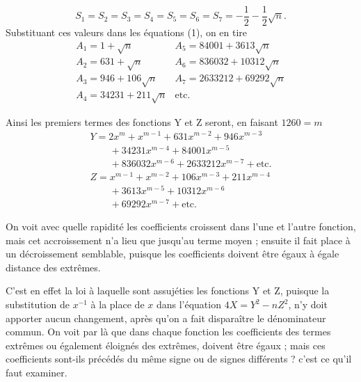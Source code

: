 \documentclass[11pt,a4paper]{article}
\begin{document}

\[
S_1 = S_2 = S_3 = S_4 = S_5 = S_6 = S_7 = -\frac{1}{2} - \frac{1}{2}\sqrt{n}.
\]
Substituant ces valeurs dans les équations (1), on en tire
\[
\begin{array}{ll}
A_1 = 1 + \sqrt{n} & A_5 = 84001 + 3613\sqrt{n} \\
A_2 = 631 + \sqrt{n} & A_6 = 836032 + 10312\sqrt{n} \\
A_3 = 946 + 106\sqrt{n} & A_7 = 2633212 + 69292\sqrt{n} \\
A_4 = 34231 + 211\sqrt{n} & \text{etc.}
\end{array}
\]

Ainsi les premiers termes des fonctions Y et Z seront, en faisant
$1260 = m$
\[
\begin{array}{l}
Y = 2x^m + x^{m-1} + 631x^{m-2} + 946x^{m-3} \\
\qquad + 34231x^{m-4} + 84001x^{m-5} \\
\qquad + 836032x^{m-6} + 2633212x^{m-7} + \text{etc.} \\
Z = x^{m-1} + x^{m-2} + 106x^{m-3} + 211x^{m-4} \\
\qquad + 3613x^{m-5} + 10312x^{m-6} \\
\qquad + 69292x^{m-7} + \text{etc.}
\end{array}
\]

On voit avec quelle rapidité les coefficients croissent dans l'une et
l'autre fonction, mais cet accroissement n'a lieu que jusqu'au terme
moyen ; ensuite il fait place à un décroissement semblable, puisque les
coefficients doivent être égaux à égale distance des extrêmes.

C'est en effet la loi à laquelle sont assujéties les fonctions Y et Z,
puisque la substitution de $x^{-1}$ à la place de $x$ dans l'équation
$4X = Y^2 - nZ^2$, n'y doit apporter aucun changement, après qu'on a fait
disparaître le dénominateur commun. On voit par là que dans chaque fonction
les coefficients des termes extrêmes ou également éloignés des extrêmes,
doivent être égaux ; mais ces coefficients sont-ils précédés du même signe
ou de signes différents ? c'est ce qu'il faut examiner.

\end{document}
